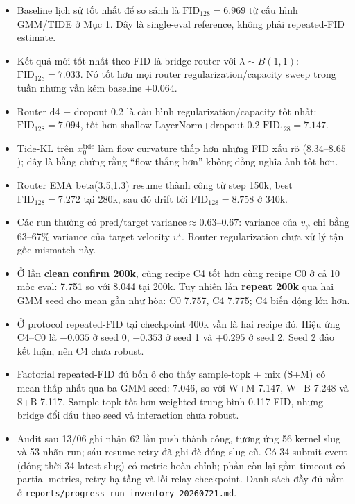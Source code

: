 \documentclass[11pt,a4paper]{article}
\newcommand{\fid}{\mathrm{FID}}
\newcommand{\run}[1]{{\small\nolinkurl{#1}}}
\begin{document}
\begin{itemize}
  \item Baseline lịch sử tốt nhất để so sánh là \(\fid_{128}=6.969\) từ cấu hình GMM/TIDE ở Mục 1. Đây là single-eval reference, không phải repeated-FID estimate.
  \item Kết quả mới tốt nhất theo FID là bridge router với \(\lambda \sim B(1,1)\): \(\fid_{128}=7.033\). Nó tốt hơn mọi router regularization/capacity sweep trong tuần nhưng vẫn kém baseline \(+0.064\).
  \item Router d4 + dropout 0.2 là cấu hình regularization/capacity tốt nhất: \(\fid_{128}=7.094\), tốt hơn shallow LayerNorm+dropout 0.2 \(\fid_{128}=7.147\).
  \item Tide-KL trên \(x_0^{\mathrm{tide}}\) làm flow curvature thấp hơn nhưng FID xấu rõ (\(8.34\)--\(8.65\)); đây là bằng chứng rằng ``flow thẳng hơn'' không đồng nghĩa ảnh tốt hơn.
  \item Router EMA beta(3.5,1.3) resume thành công từ step 150k, best \(\fid_{128}=7.272\) tại 280k, sau đó drift tới \(\fid_{128}=8.758\) ở 340k.
  \item Các run thường có \(\mathrm{pred/target\ variance}\approx0.63\)--\(0.67\): variance của \(v_\psi\) chỉ bằng 63--67\% variance của target velocity \(v^\star\). Router regularization chưa xử lý tận gốc mismatch này.
  \item Ở lần \textbf{clean confirm 200k}, cùng recipe C4 tốt hơn cùng recipe C0 ở cả 10 mốc eval: 7.751 so với 8.044 tại 200k. Tuy nhiên lần \textbf{repeat 200k} qua hai GMM seed cho mean gần như hòa: C0 7.757, C4 7.775; C4 biến động lớn hơn.
  \item Ở protocol repeated-FID tại checkpoint 400k vẫn là hai recipe đó. Hiệu ứng C4--C0 là \(-0.035\) ở seed 0, \(-0.353\) ở seed 1 và \(+0.295\) ở seed 2. Seed 2 đảo kết luận, nên C4 chưa robust.
  \item Factorial repeated-FID đủ bốn ô cho thấy sample-topk + mix (S+M) có mean thấp nhất qua ba GMM seed: 7.046, so với W+M 7.147, W+B 7.248 và S+B 7.117. Sample-topk tốt hơn weighted trung bình 0.117 FID, nhưng bridge đổi dấu theo seed và interaction chưa robust.
  \item Audit sau 13/06 ghi nhận 62 lần push thành công, tương ứng 56 kernel slug và 53 nhãn run; sáu resume retry đã ghi đè đúng slug cũ. Có 34 submit event (đồng thời 34 latest slug) có metric hoàn chỉnh; phần còn lại gồm timeout có partial metrics, retry hạ tầng và lỗi relay checkpoint. Danh sách đầy đủ nằm ở \run{reports/progress_run_inventory_20260721.md}.
\end{itemize}
\end{document}
